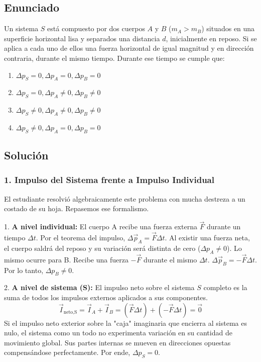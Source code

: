 \documentclass[12pt, a4paper]{article}
\begin{document}
\subsection*{Enunciado}
Un sistema $S$ está compuesto por dos cuerpos $A$ y $B$ ($m_A > m_B$) situados en una superficie horizontal lisa y separados una distancia $d$, inicialmente en reposo. Si se aplica a cada uno de ellos una fuerza horizontal de igual magnitud y en dirección contraria, durante el mismo tiempo. Durante ese tiempo se cumple que:
\begin{enumerate}[label=\alph*)]
    \item $\Delta p_S = 0, \Delta p_A = 0, \Delta p_B = 0$
    \item $\Delta p_S = 0, \Delta p_A \neq 0, \Delta p_B \neq 0$
    \item $\Delta p_S \neq 0, \Delta p_A \neq 0, \Delta p_B \neq 0$
    \item $\Delta p_S \neq 0, \Delta p_A = 0, \Delta p_B = 0$
\end{enumerate}

\subsection*{Solución}

\subsubsection*{1. Impulso del Sistema frente a Impulso Individual}
El estudiante resolvió algebraicamente este problema con mucha destreza a un costado de su hoja. Repasemos ese formalismo.

1. \textbf{A nivel individual:} 
El cuerpo A recibe una fuerza externa $\vec{F}$ durante un tiempo $\Delta t$. Por el teorema del impulso, $\Delta\vec{p}_A = \vec{F} \Delta t$. Al existir una fuerza neta, el cuerpo saldrá del reposo y su variación será distinta de cero ($\Delta p_A \neq 0$).
Lo mismo ocurre para B. Recibe una fuerza $-\vec{F}$ durante el mismo $\Delta t$. $\Delta\vec{p}_B = -\vec{F} \Delta t$. Por lo tanto, $\Delta p_B \neq 0$.

2. \textbf{A nivel de sistema (S):}
El impulso neto sobre el sistema $S$ completo es la suma de todos los impulsos externos aplicados a sus componentes.
$$ \vec{I}_{\text{neto,S}} = \vec{I}_A + \vec{I}_B = (\vec{F}\Delta t) + (-\vec{F}\Delta t) = \vec{0} $$
Si el impulso neto exterior sobre la "caja" imaginaria que encierra al sistema es nulo, el sistema como un todo no experimenta variación en su cantidad de movimiento global. Sus partes internas se mueven en direcciones opuestas compensándose perfectamente. Por ende, $\Delta p_S = 0$.
\end{document}
